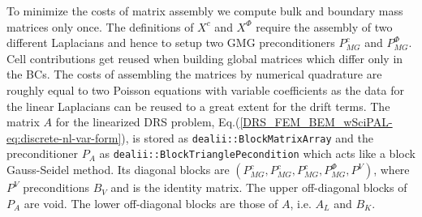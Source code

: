 \documentclass[runningheads]{lncse}
\newcommand{\mydiff}[2]{{}{#2}}
\begin{document}
To minimize the costs of matrix assembly we 
compute bulk and boundary mass matrices 
only once.
%
% 
The definitions of $X^c$ and $X^{\Phi}$ require the assembly of two different Laplacians and hence to setup two GMG preconditioners $P^c_{MG}$ and $P^{\Phi}_{MG}$.
%
Cell contributions 
get reused when building 
global matrices \mydiff{for the differences are}{which differ} only in the BCs.
%
The costs of assembling the matrices by numerical quadrature are roughly equal to two Poisson equations with variable coefficients as the data for the linear Laplacians can be reused to a great extent for the drift terms.
%
The matrix $A$ for the linearized DRS problem, Eq.(\ref{DRS_FEM_BEM_wSciPAL-eq:discrete-nl-var-form}), is stored as \verb|dealii::BlockMatrixArray| and the preconditioner $P_A$ as \verb|dealii::BlockTrianglePecondition| which acts like a block Gauss-Seidel method.
%
Its diagonal blocks are $(P^{c}_{MG}, P^{c}_{MG}, P^{c}_{MG}, P^{\Phi}_{MG}, P^V)$, where $P^V$ preconditions $B_V$ and is the identity matrix.
%
The upper off-diagonal blocks of $P_A$ are void. The lower off-diagonal blocks are those 
of
$A$, i.e. $A_L$ and $B_K$. 
\end{document}
